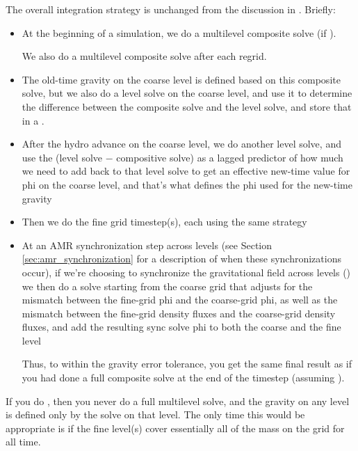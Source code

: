 The overall integration strategy is unchanged from the discussion in
\cite{castro_I}.  Briefly:
\begin{itemize}
\item At the beginning of a simulation, we do a multilevel composite
  solve (if ).  

  We also do a multilevel composite solve after each regrid.

\item The old-time gravity on the coarse level is defined based on
  this composite solve, but we also do a level solve on the coarse
  level, and use it to determine the difference between the composite
  solve and the level solve, and store that in a \multifab.

\item After the hydro advance on the coarse level, we do another level
  solve, and use the (level solve $-$ compositive solve) as a lagged
  predictor of how much we need to add back to that level solve to get
  an effective new-time value for phi on the coarse level, and that's
  what defines the phi used for the new-time gravity

\item Then we do the fine grid timestep(s), each using the same
  strategy

\item At an AMR synchronization step across levels (see Section \ref{sec:amr_synchronization}
  for a description of when these synchronizations occur), if we're choosing
  to synchronize the gravitational field across levels ()
  we then do a solve starting from
  the coarse grid that adjusts for the mismatch between the fine-grid
  phi and the coarse-grid phi, as well as the mismatch between the
  fine-grid density fluxes and the coarse-grid density fluxes, and add
  the resulting sync solve phi to both the coarse and the fine level

  Thus, to within the gravity error tolerance, you get the same final
  result as if you had done a full composite solve at the end of the
  timestep (assuming ).
\end{itemize}

If you do , then you never do a full
multilevel solve, and the gravity on any level is defined only by the
solve on that level.  The only time this would be appropriate is if
the fine level(s) cover essentially all of the mass on the grid for
all time.




